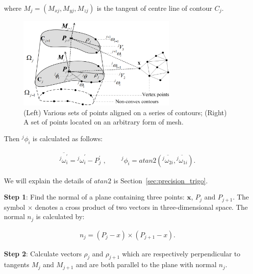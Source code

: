 where $M_j=(M_{xj}, M_{yj}, M_{zj})$ is the tangent of centre line of contour $C_j$.

\begin{figure}[ht]
\begin{center}
\includegraphics[width=0.7\textwidth]{3_precision/figures/pqa}
\end{center}
\caption[Various sets of points aligned on a series of contours; A set of points located on an arbitrary form of mesh.]{(Left) Various sets of points aligned on a series of contours; 
(Right) A set of points located on an arbitrary form of mesh.}
\label{fig:pqa_ch3}
\end{figure}

Then ${^j\phi_i}$ is calculated as follows:

\begin{equation}
\begin{aligned}
\overline{{^j\omega}^{\prime}_i} = {^j\omega}^{\prime}_i - P^{\prime}_j \mbox{ , } \qquad
{^j\phi}_i = atan2 \left ( \overline{{^j\omega}_{2i}},\overline{{^j\omega}_{1i}} \right ) \mbox{.}
\end{aligned}
\label{eqt:preprocess2}
\end{equation}

We will explain the details of $atan2$ is Section~\ref{sec:precision_trigo}.

\noindent \textbf{Step 1}:
Find the normal of a plane containing three points: $\boldsymbol{x}$, $P_j$ and $P_{j+1}$.
The symbol $\times$ denotes a cross product of two vectors in three-dimensional space.
The normal $n_j$ is calculated by:

\begin{equation}
\begin{aligned}
n_j = \left ( P_j-x \right ) \times \left ( P_{j+1}-x \right ) \mbox{.}
\end{aligned}
\label{eqt:normal}
\end{equation}

\noindent \textbf{Step 2}:
Calculate vectors $\rho_j$ and $\rho_{j+1}$ which are respectively perpendicular to tangents $M_j$ and $M_{j+1}$ and are both parallel to the plane with normal $n_j$.

